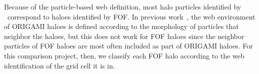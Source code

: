 Because of the particle-based web definition, most halo particles identified by \origami\ correspond to haloes identified by FOF. In previous work~\citep{2014JCAP...07..058F}, the web environment of ORIGAMI haloes is defined according to the morphology of particles that neighbor the haloes, but this does not work for FOF haloes since the neighbor particles of FOF haloes are most often included as part of ORIGAMI haloes. For this comparison project, then, we classify each FOF halo according to the web identification of the grid cell it is in.






